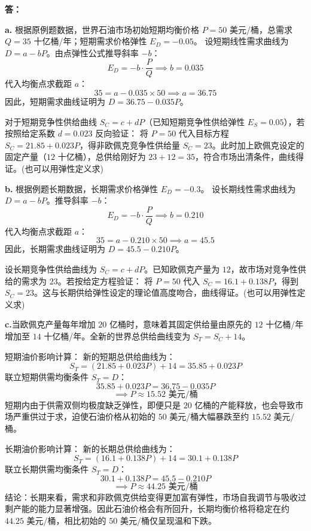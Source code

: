 \begin{enumerate}[label=\textbf{\arabic*.}, leftmargin=*]
			\textbf{答：}
			
			\textbf{a.} 根据原例题数据，世界石油市场初始短期均衡价格 $P=50$ 美元/桶，总需求 $Q=35$ 十亿桶/年；短期需求价格弹性 $E_D = -0.05$。
			设短期线性需求曲线为 $D = a - bP$。由点弹性公式推导斜率 $-b$：
			$$ E_D = -b \cdot \frac{P}{Q} \implies b = 0.035 $$
			代入均衡点求截距 $a$：
			$$ 35 = a - 0.035 \times 50 \implies a = 36.75 $$
			因此，短期需求曲线证明为 $D = 36.75 - 0.035P$。
			
			对于短期竞争性供给曲线 $S_C = c + dP$（已知短期竞争性供给弹性 $E_S = 0.05$），若按照给定系数 $d = 0.023$ 反向验证：
			将 $P=50$ 代入目标方程 $S_C = 21.85 + 0.023P$，得非欧佩克竞争性供给量 $S_C = 23$。此时加上欧佩克设定的固定产量（$12$ 十亿桶），总供给刚好为 $23 + 12 = 35$，符合市场出清条件，曲线得证。(也可以用弹性定义求)
			
			\vspace{1em}
			\textbf{b.} 根据例题长期数据，长期需求价格弹性 $E_D = -0.3$。
			设长期线性需求曲线为 $D = a - bP$。推导斜率 $-b$：
			$$ E_D = -b \cdot \frac{P}{Q} \implies b = 0.210 $$
			代入均衡点求截距 $a$：
			$$ 35 = a - 0.210 \times 50 \implies a = 45.5 $$
			因此，长期需求曲线证明为 $D = 45.5 - 0.210P$。
			
			设长期竞争性供给曲线为 $S_C = c + dP$。已知欧佩克产量为 $12$，故市场对竞争性供给的需求为 $23$。若按给定方程验证：
			将 $P=50$ 代入 $S_C = 16.1 + 0.138P$，得到 $S_C = 23$。这与长期供给弹性设定的理论值高度吻合，曲线得证。(也可以用弹性定义求)
			
			\vspace{1em}
			\textbf{c.}当欧佩克产量每年增加 $20$ 亿桶时，意味着其固定供给量由原先的 $12$ 十亿桶/年增加至 $14$ 十亿桶/年。全新的世界总供给曲线变为 $S_T = S_C + 14$。
			
			短期油价影响计算：
			新的短期总供给曲线为：
			$$ S_{T} = (21.85 + 0.023P) + 14 = 35.85 + 0.023P $$
			联立短期供需均衡条件 $S_{T} = D$：
				$$ 35.85 + 0.023P = 36.75 - 0.035P $$
			$$ \implies P \approx 15.52 \text{ 美元/桶} $$
			短期内由于供需双侧均极度缺乏弹性，即便只是 $20$ 亿桶的产能释放，也会导致市场严重供过于求，迫使石油价格从初始的 $50$ 美元/桶大幅暴跌至约 $15.52$ 美元/桶。
			
			长期油价影响计算：
			新的长期总供给曲线为：
			$$ S_{T} = (16.1 + 0.138P) + 14 = 30.1 + 0.138P $$
			联立长期供需均衡条件 $S_{T} = D$：
				$$ 30.1 + 0.138P = 45.5 - 0.210P $$
			$$  \implies P \approx 44.25 \text{ 美元/桶} $$
			结论：长期来看，需求和非欧佩克供给变得更加富有弹性，市场自我调节与吸收过剩产能的能力显著增强。因此石油价格会有所回升，长期均衡价格将稳定在约 $44.25$ 美元/桶，相比初始的 $50$ 美元/桶仅呈现温和下跌。
			

\end{enumerate}
